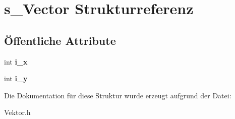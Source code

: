 \hypertarget{structs___vector}{\section{s\-\_\-\-Vector Strukturreferenz}
\label{structs___vector}
}
\subsection*{Öffentliche Attribute}
\begin{DoxyCompactItemize}
\item 
\hypertarget{structs___vector_a530003f44afc98b7ce7e51f77ef8f291}{int {\bfseries i\-\_\-x}}\label{structs___vector_a530003f44afc98b7ce7e51f77ef8f291}

\item 
\hypertarget{structs___vector_a13bd27672ca23d2302f5c24359f67ed2}{int {\bfseries i\-\_\-y}}\label{structs___vector_a13bd27672ca23d2302f5c24359f67ed2}

\end{DoxyCompactItemize}


Die Dokumentation für diese Struktur wurde erzeugt aufgrund der Datei\-:\begin{DoxyCompactItemize}
\item 
Vektor.\-h\end{DoxyCompactItemize}
